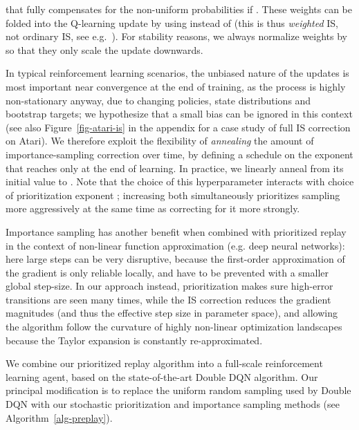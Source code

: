 \documentclass[a4paper]{article}
\begin{document}
that fully compensates for the non-uniform probabilities  if .
These weights can be folded into the Q-learning update by using  instead of  
(this is thus \emph{weighted} IS, not ordinary IS, see e.g.\ \citealp{wis}).
For stability reasons, we always normalize weights by  so that they only scale the update downwards.

In typical reinforcement learning scenarios, the unbiased nature of the updates is most important
near convergence at the end of training, as the process is highly non-stationary anyway, 
due to changing policies, state distributions and bootstrap targets;
we hypothesize that a small bias can be ignored in this context
(see also Figure~\ref{fig-atari-is} in the appendix for a case study of full IS correction on Atari).
We therefore exploit the flexibility of \emph{annealing} the amount of importance-sampling 
correction over time, by defining a schedule on the exponent  that 
reaches  only at the end of learning.
In practice, we linearly anneal  from its initial value  to .
Note that the choice of this hyperparameter 
interacts with choice of prioritization exponent ; increasing both simultaneously prioritizes sampling more aggressively at the same time as correcting for it more strongly.

Importance sampling has another benefit when combined with prioritized replay in the context of non-linear function approximation (e.g. deep neural networks):
here large steps can be very disruptive,
because the first-order approximation of the gradient is only reliable locally,
and have to be prevented with a smaller global step-size.
In our approach instead, prioritization makes sure high-error transitions are seen many times, while the IS correction reduces the gradient magnitudes 
(and thus the effective step size in parameter space),
and allowing the algorithm follow the curvature of highly non-linear optimization landscapes because the Taylor expansion is constantly re-approximated.

We combine our prioritized replay algorithm into a full-scale reinforcement learning agent, based on the state-of-the-art Double DQN algorithm. Our principal modification is to replace the uniform random sampling used by Double DQN with our stochastic prioritization and importance sampling methods (see Algorithm~\ref{alg-preplay}).
\end{document}
